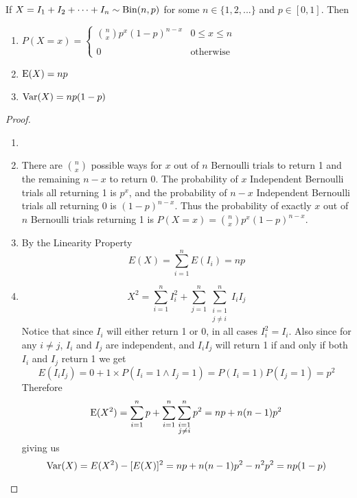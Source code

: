 \documentclass{report}
\begin{document}
\begin{theorem}
    If $X=I_1+I_2+\cdots +I_n \sim \textup{Bin}(n,p)$ for some $n\in\{1,2,...\}$ and $p\in[0,1]$. Then
    \begin{enumerate}
        \item $P(X=x)=\begin{cases}
            \displaystyle\binom n x p^x(1-p)^{n-x} & 0\le x \le n \\\\
            0 & \text{otherwise}
        \end{cases}$
        \item $\textup{E}(X)=np$
        \item $\textup{Var}(X)=np(1-p)$
    \end{enumerate}
    \begin{proof}
    
        \begin{enumerate}
            \item[]
            \item There are $\binom nx$ possible ways for $x$ out of $n$ Bernoulli trials to return 1 and the remaining $n-x$ to return 0. The probability of $x$ Independent Bernoulli trials all returning 1 is $p^x$, and the probability of $n-x$ Independent Bernoulli trials all returning $0$ is $(1-p)^{n-x}$. Thus the probability of exactly $x$ out of $n$ Bernoulli trials returning 1 is $P(X=x)=\binom n x p^x(1-p)^{n-x}$. 
            \item By the Linearity Property
            \[
                E(X)=\sum_{i=1}^n E(I_i)=np
            \]
            \item 
            \[
                X^2=\sum_{i=1}^n I_i^2 + \sum_{j=1}^n\sum_{\substack{i=1 \\ j\ne i}}^n I_i I_j
            \]
            Notice that since $I_i$ will either return 1 or 0, in all cases $I_i^2=I_i$. Also since for any $i\ne j$, $I_i$ and $I_j$ are independent, and $I_i I_j$ will return 1 if and only if both $I_i$ and $I_j$ return 1 we get
            \[
                E(I_i I_j)=0+1\times P(I_i=1 \land I_j=1)=P(I_i=1)P(I_j=1)=p^2
            \]
            Therefore
            \[
                \textup{E}(X^2)=\sum_{i=1}^n p + \sum_{i=1}^n\sum_{\substack{i=1 \\ j\ne i}}^n p^2 = np+n(n-1)p^2
            \]
            giving us
            \[
                \textup{Var}(X)=E(X^2)-[E(X)]^2= np+n(n-1)p^2 - n^2p^2=np(1-p)
            \]
        \end{enumerate}
    \end{proof}
    
    
\end{theorem}
\end{document}
